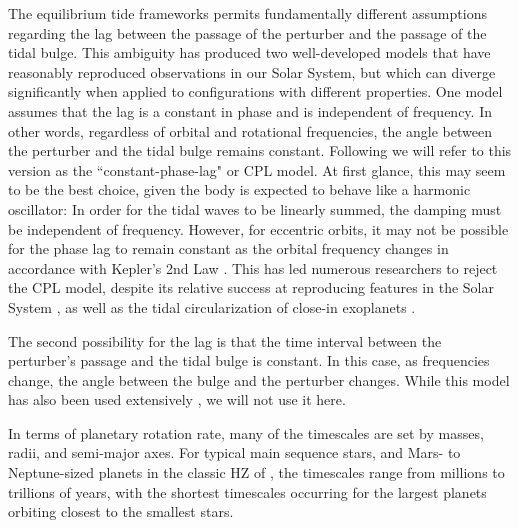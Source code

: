 \documentclass[preprint,12pt]{aastex}
\def\eg{{\it e.g.\ }}
\begin{document}
The equilibrium tide frameworks permits fundamentally different assumptions
regarding the lag between the passage of the perturber and the passage
of the tidal bulge. This ambiguity has produced two well-developed
models that have reasonably reproduced observations in our Solar
System, but which can diverge significantly when applied to
configurations with different properties. One model assumes that the
lag is a constant in phase and is independent of frequency. In other
words, regardless of orbital and rotational frequencies, the angle
between the perturber and the tidal bulge remains constant. Following
\cite{Greenberg09} we will refer to this version as the
``constant-phase-lag" or CPL model. At first glance, this may seem to
be the best choice, given the body is expected to behave like a
harmonic oscillator: In order for the tidal waves to be linearly
summed, the damping must be independent of frequency. However, for
eccentric orbits, it may not be possible for the phase lag to remain
constant as the orbital frequency changes in accordance with Kepler's
2nd Law \citep{ToumaWisdom94,EfroimskyMakarov13}. This has led
numerous researchers to reject the CPL model, despite its relative
success at reproducing features in the Solar System
\citep[\eg][]{MacDonald64,Hut81,GoldreichSoter66,Peale79}, as well as
the tidal circularization of close-in exoplanets \citep{Jackson08a}.

The second possibility for the lag is that the time interval between
the perturber's passage and the tidal bulge is constant. In this case,
as frequencies change, the angle between the bulge and the perturber
changes. While this model has also been used extensively \citep{Leconte10,Bolmont12,Barnes13,Barnes16}, we will not use it here.

In terms of planetary rotation rate, many of the timescales are set by
masses, radii, and semi-major axes. For typical main sequence stars,
and Mars- to Neptune-sized planets in the classic HZ of
\cite{Kasting93}, the timescales range from millions to trillions of
years, with the shortest timescales occurring for the largest planets
orbiting closest to the smallest stars.
\end{document}
